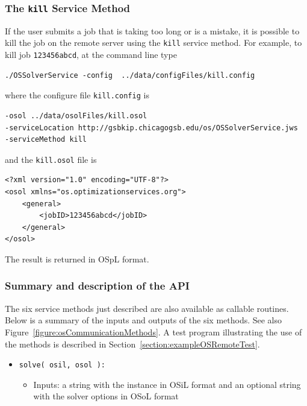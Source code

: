 \documentclass[11pt]{article}
\newcounter{Fig}
\renewcommand{\_}{{\char"5F}}
\renewcommand{\{}{{\char"7B}}
\renewcommand{\}}{{\char"7D}}
\renewcommand{\^}{{\char"0D}}
\renewcommand{\'}{{\char"0D}}
\begin{document}
\begin{enumerate}[Step 1:]
\subsubsection{The  {\tt kill}   Service Method}

If the user submits a job that is taking too long or is a mistake, it is possible to kill the job on the remote server using the {\tt kill} service method.
For example, to kill job {\tt 123456abcd}, at the command line type
\begin{verbatim}
./OSSolverService -config  ../data/configFiles/kill.config
\end{verbatim}
where the configure file {\tt kill.config} is
\begin{verbatim}
-osol ../data/osolFiles/kill.osol
-serviceLocation http://gsbkip.chicagogsb.edu/os/OSSolverService.jws
-serviceMethod kill
\end{verbatim}
and the {\tt kill.osol} file is
\begin{verbatim}
<?xml version="1.0" encoding="UTF-8"?>
<osol xmlns="os.optimizationservices.org">
    <general>
        <jobID>123456abcd</jobID>
    </general>
</osol>
\end{verbatim}

The result is returned in  OSpL format.



\subsubsection{Summary and description of the API}

The six service methods just described are also available as callable routines.
Below is a summary of the inputs and outputs of the six methods. See also Figure~\ref{figure:osCommunicationMethods}.
A test program illustrating the use of the methods is described in Section~\ref{section:exampleOSRemoteTest}.

\begin{itemize}

\item {\tt solve( osil, osol ):}

\begin{itemize}

\item Inputs: a string with the instance in OSiL format and an optional string with the solver options 
in OSoL format


\end{itemize}
\end{itemize}
\end{enumerate}
\end{document}
